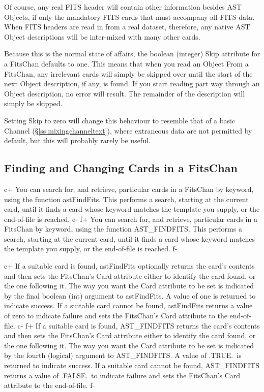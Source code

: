 \documentclass[twoside,11pt]{article}
\newcommand{\secref}[1]{\S\ref{#1}}
\newcommand{\secref}[1]{\ref{#1}}
\begin{document}
Of course, any real FITS header will contain other information besides
AST Objects, if only the mandatory FITS cards that must accompany all
FITS data. When FITS headers are read in from a real dataset,
therefore, any native AST Object descriptions will be inter-mixed with
many other cards.

Because this is the normal state of affairs, the boolean (integer)
Skip attribute for a FitsChan defaults to one. This means that when
you read an Object From a FitsChan, any irrelevant cards will simply
be skipped over until the start of the next Object description, if
any, is found. If you start reading part way through an Object
description, no error will result. The remainder of the description
will simply be skipped.

Setting Skip to zero will change this behaviour to resemble that of a
basic Channel (\secref{ss:mixingchanneltext}), where extraneous data
are not permitted by default, but this will probably rarely be useful.

\subsection{\label{ss:findingandchangingfits}Finding and Changing Cards in a FitsChan}

c+
You can search for, and retrieve, particular cards in a FitsChan by
keyword, using the function astFindFits. This performs a search,
starting at the current card, until it finds a card whose keyword
matches the template you supply, or the end-of-file is reached.
c-
f+
You can search for, and retrieve, particular cards in a FitsChan by
keyword, using the function AST\_FINDFITS. This performs a search,
starting at the current card, until it finds a card whose keyword
matches the template you supply, or the end-of-file is reached.
f-

c+
If a suitable card is found, astFindFits optionally returns the card's
contents and then sets the FitsChan's Card attribute either to
identify the card found, or the one following it. The way you want the
Card attribute to be set is indicated by the final boolean (int)
argument to astFindFits. A value of one is returned to indicate
success.  If a suitable card cannot be found, astFindFits returns a
value of zero to indicate failure and sets the FitsChan's Card
attribute to the end-of-file.
c-
f+
If a suitable card is found, AST\_FINDFITS returns the card's contents
and then sets the FitsChan's Card attribute either to identify the
card found, or the one following it. The way you want the Card
attribute to be set is indicated by the fourth (logical) argument to
AST\_FINDFITS. A value of .TRUE.\ is returned to indicate success.  If
a suitable card cannot be found, AST\_FINDFITS returns a value of
.FALSE.\ to indicate failure and sets the FitsChan's Card attribute to
the end-of-file.
f-
\end{document}
